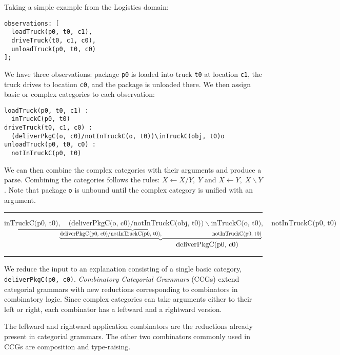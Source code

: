 Taking a simple example from the Logistics domain:

\lstset{
  basicstyle=\ttfamily\scriptsize,
  breaklines=true,
  frame=tb
}

\begin{lstlisting}
observations: [
  loadTruck(p0, t0, c1),
  driveTruck(t0, c1, c0),
  unloadTruck(p0, t0, c0)
];
\end{lstlisting}

We have three observations: package \texttt{p0} is loaded into truck \texttt{t0} at location \texttt{c1}, the truck drives to location \texttt{c0}, and the package is unloaded there. We then assign basic or complex categories to each observation:

\begin{lstlisting}
loadTruck(p0, t0, c1) :
  inTruckC(p0, t0)
driveTruck(t0, c1, c0) :
  (deliverPkgC(o, c0)/notInTruckC(o, t0))\inTruckC(obj, t0)o
unloadTruck(p0, t0, c0) :
  notInTruckC(p0, t0)
\end{lstlisting}


We can then combine the complex categories with their arguments and produce a parse. Combining the categories follows the rules: $ X\leftarrow X/Y,\; Y$ and $ X\leftarrow Y,\; X\backslash Y$. Note that package \texttt{o} is unbound until the complex category is unified with an argument.

\noindent\rule{\textwidth}{0.4pt}
{\ttfamily\scriptsize
$\underbrace{\text{inTruckC(p0, t0)},\quad \text{(deliverPkgC(o, c0)}/\text{notInTruckC(obj, t0))}\backslash{}\text{inTruckC(o, t0)}},\quad \text{notInTruckC(p0, t0)}$\\
$\hspace*{10em}\underbrace{\text{deliverPkgC(p0, c0)}/\text{notInTruckC(p0, t0)},\hspace*{9em}\text{notInTruckC(p0, t0)}}$\\
$\hspace*{24em} \text{deliverPkgC(p0, c0)}$
}\\
\noindent\rule{\textwidth}{0.4pt}

We reduce the input to an explanation consisting of a single basic category, \texttt{deliverPkgC(p0, c0)}.
\emph{Combinatory Categorial Grammars} (CCGs) extend categorial grammars with new reductions corresponding to combinators in combinatory logic. Since complex categories can take arguments either to their left or right, each combinator has a leftward and a rightward version.

The leftward and rightward application combinators are the reductions already present in categorial grammars. The other two combinators commonly used in CCGs are composition and type-raising.

